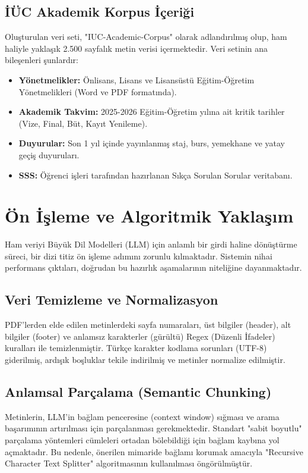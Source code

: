 \documentclass[12pt,a4paper]{report}
\begin{document}
\subsection{İÜC Akademik Korpus İçeriği}
Oluşturulan veri seti, "IUC-Academic-Corpus" olarak adlandırılmış olup, ham haliyle yaklaşık 2.500 sayfalık metin verisi içermektedir. Veri setinin ana bileşenleri şunlardır:
\begin{itemize}
    \item \textbf{Yönetmelikler:} Önlisans, Lisans ve Lisansüstü Eğitim-Öğretim Yönetmelikleri (Word ve PDF formatında).
    \item \textbf{Akademik Takvim:} 2025-2026 Eğitim-Öğretim yılına ait kritik tarihler (Vize, Final, Büt, Kayıt Yenileme).
    \item \textbf{Duyurular:} Son 1 yıl içinde yayınlanmış staj, burs, yemekhane ve yatay geçiş duyuruları.
    \item \textbf{SSS:} Öğrenci işleri tarafından hazırlanan Sıkça Sorulan Sorular veritabanı.
\end{itemize}

\newpage
\section{Ön İşleme ve Algoritmik Yaklaşım}
Ham veriyi Büyük Dil Modelleri (LLM) için anlamlı bir girdi haline dönüştürme süreci, bir dizi titiz ön işleme adımını zorunlu kılmaktadır. Sistemin nihai performans çıktıları, doğrudan bu hazırlık aşamalarının niteliğine dayanmaktadır.

\subsection{Veri Temizleme ve Normalizasyon}
PDF'lerden elde edilen metinlerdeki sayfa numaraları, üst bilgiler (header), alt bilgiler (footer) ve anlamsız karakterler (gürültü) Regex (Düzenli İfadeler) kuralları ile temizlenmiştir. Türkçe karakter kodlama sorunları (UTF-8) giderilmiş, ardışık boşluklar tekile indirilmiş ve metinler normalize edilmiştir.

\subsection{Anlamsal Parçalama (Semantic Chunking)}
Metinlerin, LLM'in bağlam penceresine (context window) sığması ve arama başarımının artırılması için parçalanması gerekmektedir. Standart "sabit boyutlu" parçalama yöntemleri cümleleri ortadan bölebildiği için bağlam kaybına yol açmaktadır. Bu nedenle, önerilen mimaride bağlamı korumak amacıyla "Recursive Character Text Splitter" algoritmasının kullanılması öngörülmüştür.
\end{document}

